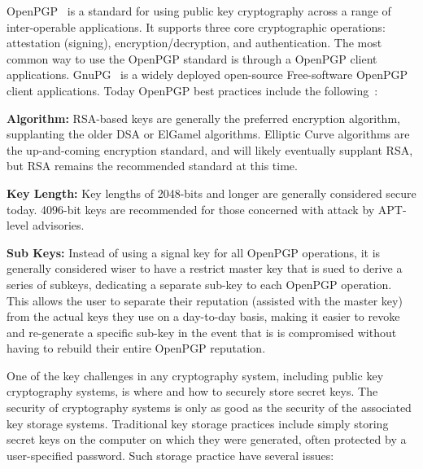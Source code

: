 \documentclass[11pt, twocolumn]{article}
\newenvironment{packed_desc}{
\begin{description}
  \setlength{\itemsep}{1pt}
  \setlength{\parskip}{0pt}
  \setlength{\parsep}{0pt}
}{\end{description}}
\begin{document}
OpenPGP~\cite{openpgp, rfc4880} is a standard for using public key
cryptography across a range of inter-operable applications. It
supports three core cryptographic operations: attestation (signing),
encryption/decryption, and authentication. The most common way to use
the OpenPGP standard is through a OpenPGP client
applications. GnuPG~\cite{gnupg} is a widely deployed open-source
Free-software OpenPGP client applications. Today OpenPGP best
practices include the following~\cite{matt-openpgp}:

\begin{packed_desc}
\item{\textbf{Algorithm:}} RSA-based keys are generally the preferred
  encryption algorithm, supplanting the older DSA or ElGamel
  algorithms. Elliptic Curve algorithms are the up-and-coming
  encryption standard, and will likely eventually supplant RSA, but
  RSA remains the recommended standard at this time.
\item{\textbf{Key Length:}} Key lengths of 2048-bits and longer are
  generally considered secure today. 4096-bit keys are recommended for
  those concerned with attack by APT-level advisories.
\item{\textbf{Sub Keys:}} Instead of using a signal key for all
  OpenPGP operations, it is generally considered wiser to have a
  restrict master key that is sued to derive a series of subkeys,
  dedicating a separate sub-key to each OpenPGP operation. This allows
  the user to separate their reputation (assisted with the master key)
  from the actual keys they use on a day-to-day basis, making it
  easier to revoke and re-generate a specific sub-key in the event
  that is is compromised without having to rebuild their entire
  OpenPGP reputation.
\end{packed_desc}

One of the key challenges in any cryptography system, including public
key cryptography systems, is where and how to securely store secret
keys. The security of cryptography systems is only as good as the
security of the associated key storage systems. Traditional key
storage practices include simply storing secret keys on the computer
on which they were generated, often protected by a user-specified
password. Such storage practice have several issues:
\end{document}
